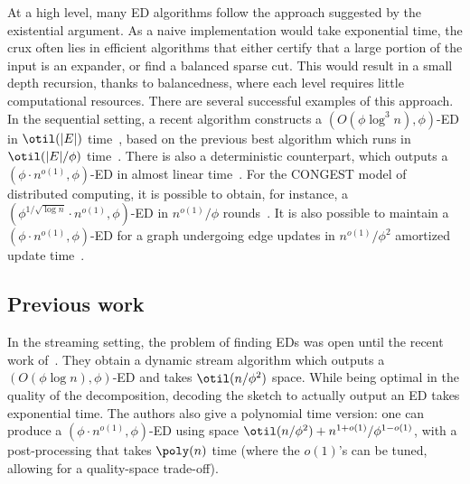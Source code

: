 At a high level, many ED algorithms follow the approach suggested by the existential argument. As a naive implementation would take exponential time, the crux often lies in efficient algorithms that either certify that a large portion of the input is an expander, or find a balanced sparse cut. This would result in a small depth recursion, thanks to balancedness, where each level requires little computational resources. There are several successful examples of this approach. In the sequential setting, a recent algorithm constructs a $(O(\phi \log^3 n), \phi)$-ED in $\otil(|E|)$ time~\cite{liexpdec}, based on the previous best algorithm which runs in $\otil(|E|/\phi)$ time~\cite{offlineexpdec}. There is also a deterministic counterpart, which outputs a $(\phi \cdot n^{o(1)}, \phi)$-ED in almost linear time~\cite{determexpdec}. For the CONGEST model of distributed computing, it is possible to obtain, for instance, a $(\phi^{1/\sqrt{\log n}} \cdot n^{o(1)}, \phi)$-ED in $n^{o(1)} / \phi$ rounds~\cite{triang}. It is also possible to maintain a $(\phi \cdot n^{o(1)},\phi)$-ED for a graph undergoing edge updates in $n^{o(1)}/\phi^2$ amortized update time~\cite{boundlink,dynexpdec}.

\subsection{Previous work}
In the streaming setting, the problem of finding EDs was open until the recent work of~\cite{streamexpdec}. They obtain a dynamic stream algorithm which outputs a $(O(\phi \log n),\phi)$-ED and takes $\otil(n/\phi^2)$ space. While being optimal in the quality of the decomposition, decoding the sketch to actually output an ED takes exponential time. The authors also give a polynomial time version: one can produce a $(\phi \cdot n^{o(1)}, \phi)$-ED using space $\otil(n/\phi^2)+n^{1+o(1)}/\phi^{1-o(1)}$, with a post-processing that takes $\poly(n)$ time (where the $o(1)$'s can be tuned, allowing for a quality-space trade-off).

